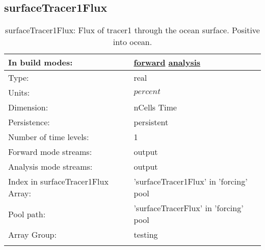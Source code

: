 \subsection[surfaceTracer1Flux]{surfaceTracer1Flux}
\label{subsec:var_sec_forcing_surfaceTracer1Flux}
\begin{center}
\begin{longtable}{| p{2.0in} | p{4.0in} |}
        \hline 
        In build modes: & \hyperref[subsec:forward_var_tab_forcing]{forward} \hyperref[subsec:analysis_var_tab_forcing]{analysis} \\
        \hline 
        Type: & real \\
        \hline 
        Units: & $percent$ \\
        \hline 
        Dimension: & nCells Time \\
        \hline 
        Persistence: & persistent \\
        \hline 
        Number of time levels: & 1 \\
        \hline 
		 Forward mode streams: &  output \\
        \hline 
		 Analysis mode streams: &  output \\
        \hline 
		 Index in surfaceTracer1Flux Array: & 'surfaceTracer1Flux' in 'forcing' pool \\
		 \hline 
            Pool path: & 'surfaceTracerFlux' in 'forcing' pool
 \\
		 \hline 
		 Array Group: & testing \\
		 \hline 
    \caption{surfaceTracer1Flux: Flux of tracer1 through the ocean surface. Positive into ocean.}
\end{longtable}
\end{center}
